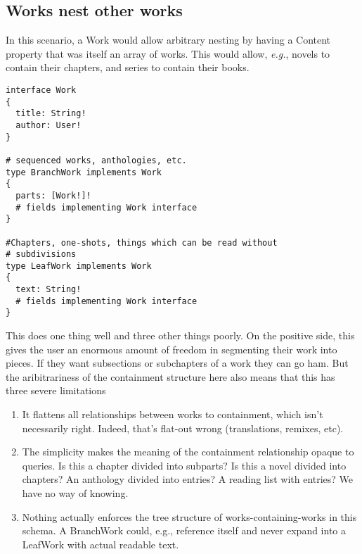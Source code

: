 \documentclass{amsart}
\theoremstyle{remark}
\begin{document}
\subsection{Works nest other works}
In this scenario, a Work would allow arbitrary nesting by having a Content property that was itself an array of works. This would allow, \textit{e.g.}, novels to contain their chapters, and series to contain their books. 
\begin{lstlisting}[frame=single,basicstyle=\small]
interface Work
{
  title: String!
  author: User!    
}

# sequenced works, anthologies, etc. 
type BranchWork implements Work
{
  parts: [Work!]!
  # fields implementing Work interface
}

#Chapters, one-shots, things which can be read without
# subdivisions
type LeafWork implements Work
{
  text: String! 
  # fields implementing Work interface
}
\end{lstlisting}

This does one thing well and three other things poorly. On the positive side, this gives the user an enormous amount of freedom in segmenting their work into pieces. If they want subsections or subchapters of a work they can go ham. But the aribitrariness of the containment structure here also means that this has three severe limitations
\begin{enumerate}
  \item \label{prob:unnuanced} It flattens all relationships between works to containment, which isn't necessarily right. Indeed, that's flat-out wrong (translations, remixes, etc).
  \item \label{prob:opaque} The simplicity makes the meaning of the containment relationship opaque to queries. Is this a chapter divided into subparts? Is this a novel divided into chapters? An anthology divided into entries? A reading list with entries? We have no way of knowing.
  \item \label{prob:unconstrained} Nothing actually enforces the tree structure of works-containing-works in this schema. A BranchWork could, e.g., reference itself and never expand into a LeafWork with actual readable text.
\end{enumerate}
\end{document}
